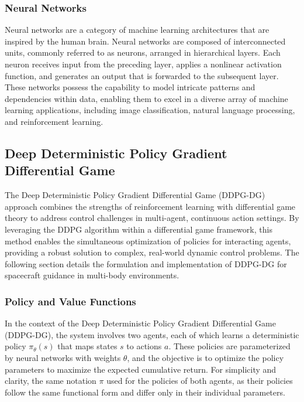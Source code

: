 \documentclass[conference]{IEEEtran}
\begin{document}
\subsubsection{Neural Networks}
Neural networks are a category of machine learning architectures that are inspired by the human brain.
Neural networks are composed of interconnected units, commonly referred to as neurons, arranged in hierarchical layers. Each neuron receives input from the preceding layer, applies a nonlinear activation function, and generates an output that is forwarded to the subsequent layer. These networks possess the capability to model intricate patterns and dependencies within data, enabling them to excel in a diverse array of machine learning applications, including image classification, natural language processing, and reinforcement learning.



\subsection{Deep Deterministic Policy Gradient Differential Game}
The Deep Deterministic Policy Gradient Differential Game (DDPG-DG) approach combines the strengths of reinforcement learning with differential game theory to address control challenges in multi-agent, continuous action settings. By leveraging the DDPG algorithm within a differential game framework, this method enables the simultaneous optimization of policies for interacting agents, providing a robust solution to complex, real-world dynamic control problems. The following section details the formulation and implementation of DDPG-DG for spacecraft guidance in multi-body environments.


\subsubsection{Policy and Value Functions}

In the context of the Deep Deterministic Policy Gradient Differential Game (DDPG-DG), the system involves two agents, each of which learns a deterministic policy \( \pi_{\theta}(s) \) that maps states \( s \) to actions \( a \). These policies are parameterized by neural networks with weights \( \theta \), and the objective is to optimize the policy parameters to maximize the expected cumulative return. For simplicity and clarity, the same notation \( \pi \) used for the policies of both agents, as their policies follow the same functional form and differ only in their individual parameters.
\end{document}
